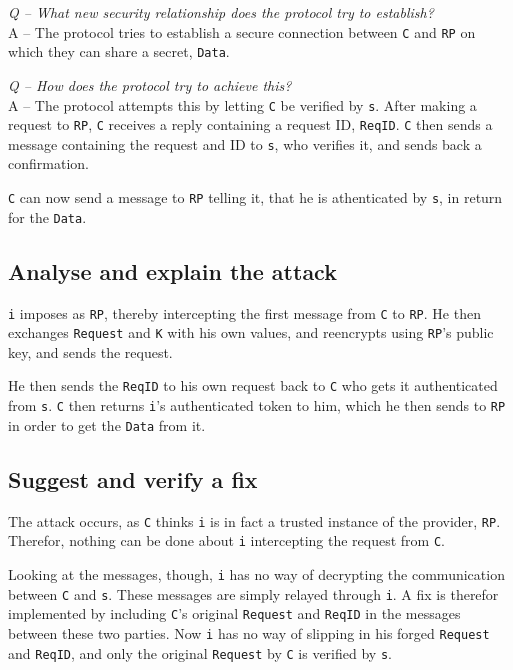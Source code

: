 \documentclass{article}
\newcommand\Q[1]{
	\leavevmode\par
	\noindent
	\emph{Q -- #1}
	\\
}
\newcommand\A[1]{
	A -- #1
}
\begin{document}
\Q{What new security relationship does the protocol try to establish?}
\A{
	The protocol tries to establish a secure connection between \texttt{C}
	and \texttt{RP} on which they can share a secret, \texttt{Data}.
}

\Q{How does the protocol try to achieve this?}
\A{
	The protocol attempts this by letting \texttt{C} be verified by \texttt{s}.
	After making a request to \texttt{RP}, \texttt{C} receives a reply
	containing a request ID, \texttt{ReqID}.
	\texttt{C} then sends a message containing the request and ID to \texttt{s},
	who verifies it, and sends back a confirmation.

	\texttt{C} can now send a message to \texttt{RP} telling it, that he is
	athenticated by \texttt{s}, in return for the \texttt{Data}.
}

\subsection{Analyse and explain the attack}
\texttt{i} imposes as \texttt{RP}, thereby intercepting the first message from
\texttt{C} to \texttt{RP}. He then exchanges \texttt{Request} and \texttt{K} 
with his own values, and reencrypts using \texttt{RP}'s public key, and sends the request.

He then sends the \texttt{ReqID} to his own request back to \texttt{C} who gets it
authenticated from \texttt{s}. \texttt{C} then returns \texttt{i}'s authenticated
token to him, which he then sends to \texttt{RP} in order to get the \texttt{Data}
from it.

\subsection{Suggest and verify a fix}
The attack occurs, as \texttt{C} thinks \texttt{i} is in fact a trusted
instance of the provider, \texttt{RP}. Therefor, nothing can be done
about \texttt{i} intercepting the request from \texttt{C}.

Looking at the messages, though, \texttt{i} has no way of decrypting
the communication between \texttt{C} and \texttt{s}.
These messages are simply relayed through \texttt{i}.
A fix is therefor implemented by including \texttt{C}'s original
\texttt{Request} and \texttt{ReqID} in the messages between these two parties.
Now \texttt{i} has no way of slipping in his forged \texttt{Request} and
\texttt{ReqID}, and only the original \texttt{Request} by \texttt{C}
is verified by \texttt{s}.
\end{document}
